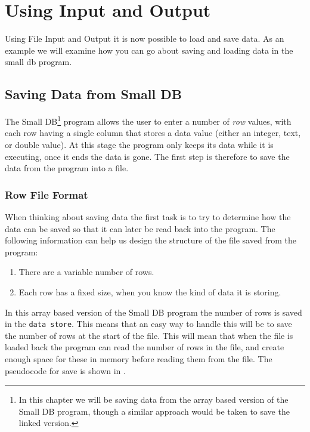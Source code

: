 \clearpage
\section{Using Input and Output} %
\label{sec:using_input_and_output}

Using File Input and Output it is now possible to load and save data. As an example we will examine how you can go about saving and loading data in the small db program.

\subsection{Saving Data from Small DB} %
\label{ssub:saving_data_from_small_db}

The Small DB\footnote{In this chapter we will be saving data from the array based version of the Small DB program, though a similar approach would be taken to save the linked version.} program allows the user to enter a number of \emph{row} values, with each row having a single column that stores a data value (either an integer, text, or double value). At this stage the program only keeps its data while it is executing, once it ends the data is gone. The first step is therefore to save the data from the program into a file.

\subsubsection{Row File Format} %
\label{ssub:row_file_format}

When thinking about saving data the first task is to try to determine how the data can be saved so that it can later be read back into the program. The following information can help us design the structure of the file saved from the program: 

\begin{enumerate}
  \item There are a variable number of rows.
  \item Each row has a fixed size, when you know the kind of data it is storing.
\end{enumerate}

In this array based version of the Small DB program the number of rows is saved in the \texttt{data store}. This means that an easy way to handle this will be to save the number of rows at the start of the file. This will mean that when the file is loaded back the program can read the number of rows in the file, and create enough space for these in memory before reading them from the file. The pseudocode for save is shown in .

